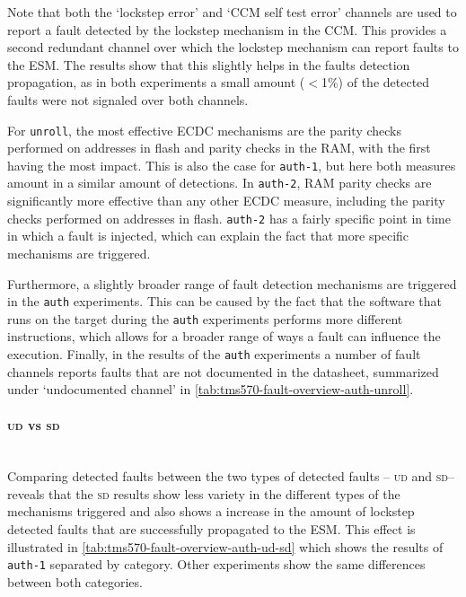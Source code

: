 \documentclass[10pt]{article}
\newcommand{\unroll}{\texttt{unroll}\xspace}
\newcommand{\auth}{\texttt{auth}\xspace}
\newcommand{\authone}{\texttt{auth-1}\xspace}
\newcommand{\authtwo}{\texttt{auth-2}\xspace}
\newcommand{\UD}{\textsc{ud}\xspace}
\newcommand{\SD}{\textsc{sd}\xspace}
\begin{document}
        Note that both the `lockstep error' and `CCM self test error' channels are used to report a fault detected by the lockstep mechanism in the CCM. This provides a second redundant channel over which the lockstep mechanism can report faults to the ESM. The results show that this slightly helps in the faults detection propagation, as in both experiments a small amount ($<$1\%) of the detected faults were not signaled over both channels. 

        For \unroll, the most effective ECDC mechanisms are the parity checks performed on addresses in flash and parity checks in the RAM, with the first having the most impact. This is also the case for \authone, but here both measures amount in a similar amount of detections. In \authtwo, RAM parity checks are significantly more effective than any other ECDC measure, including the parity checks performed on addresses in flash. \authtwo has a fairly specific point in time in which a fault is injected, which can explain the fact that more specific mechanisms are triggered.

        Furthermore, a slightly broader range of fault detection mechanisms are triggered in the \auth experiments. This can be caused by the fact that the software that runs on the target during the \auth experiments performs more different instructions, which allows for a broader range of ways a fault can influence the execution. Finally, in the results of the \auth experiments a number of fault channels reports faults that are not documented in the datasheet, summarized under `undocumented channel' in \autoref{tab:tms570-fault-overview-auth-unroll}. 


      \paragraph*{\UD vs \SD} \ \\ \noindent
        Comparing detected faults between the two types of detected faults -- \UD and \SD -- reveals that the \SD results show less variety in the different types of the mechanisms triggered and also shows a increase in the amount of lockstep detected faults that are successfully propagated to the ESM. This effect is illustrated in \autoref{tab:tms570-fault-overview-auth-ud-sd} which shows the results of \authone separated by category. Other experiments show the same differences between both categories.
\end{document}
